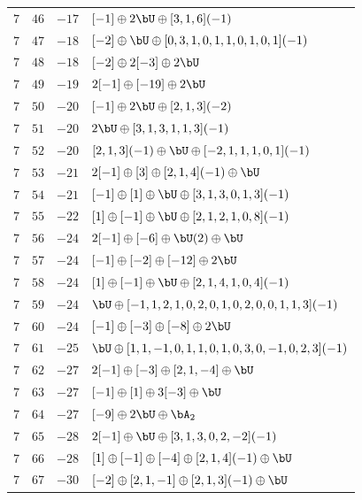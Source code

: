 \begin{center}
\begin{longtable}{llll}
 \(7\) & \(46\) & \(-17\) & \([-1] \oplus 2 \bU \oplus [3, 1, 6](-1)\) \\
 \(7\) & \(47\) & \(-18\) & \([-2] \oplus \bU \oplus [0, 3, 1, 0, 1, 1, 0, 1, 0, 1](-1)\) \\
 \(7\) & \(48\) & \(-18\) & \([-2] \oplus 2 [-3] \oplus 2 \bU\) \\
 \(7\) & \(49\) & \(-19\) & \(2 [-1] \oplus [-19] \oplus 2 \bU\) \\
 \(7\) & \(50\) & \(-20\) & \([-1] \oplus 2 \bU \oplus [2, 1, 3](-2)\) \\
 \(7\) & \(51\) & \(-20\) & \(2 \bU \oplus [3, 1, 3, 1, 1, 3](-1)\) \\
 \(7\) & \(52\) & \(-20\) & \([2, 1, 3](-1) \oplus \bU \oplus [-2, 1, 1, 1, 0, 1](-1)\) \\
 \(7\) & \(53\) & \(-21\) & \(2 [-1] \oplus [3] \oplus [2, 1, 4](-1) \oplus \bU\) \\
 \(7\) & \(54\) & \(-21\) & \([-1] \oplus [1] \oplus \bU \oplus [3, 1, 3, 0, 1, 3](-1)\) \\
 \(7\) & \(55\) & \(-22\) & \([1] \oplus [-1] \oplus \bU \oplus [2, 1, 2, 1, 0, 8](-1)\) \\
 \(7\) & \(56\) & \(-24\) & \(2 [-1] \oplus [-6] \oplus \bU(2) \oplus \bU\) \\
 \(7\) & \(57\) & \(-24\) & \([-1] \oplus [-2] \oplus [-12] \oplus 2 \bU\) \\
 \(7\) & \(58\) & \(-24\) & \([1] \oplus [-1] \oplus \bU \oplus [2, 1, 4, 1, 0, 4](-1)\) \\
 \(7\) & \(59\) & \(-24\) & \(\bU \oplus [-1, 1, 2, 1, 0, 2, 0, 1, 0, 2, 0, 0, 1, 1, 3](-1)\) \\
 \(7\) & \(60\) & \(-24\) & \([-1] \oplus [-3] \oplus [-8] \oplus 2 \bU\) \\
 \(7\) & \(61\) & \(-25\) & \(\bU \oplus [1, 1, -1, 0, 1, 1, 0, 1, 0, 3, 0, -1, 0, 2, 3](-1)\) \\
 \(7\) & \(62\) & \(-27\) & \(2 [-1] \oplus [-3] \oplus [2, 1, -4] \oplus \bU\) \\
 \(7\) & \(63\) & \(-27\) & \([-1] \oplus [1] \oplus 3 [-3] \oplus \bU\) \\
 \(7\) & \(64\) & \(-27\) & \([-9] \oplus 2 \bU \oplus \bA_{2}\) \\
 \(7\) & \(65\) & \(-28\) & \(2 [-1] \oplus \bU \oplus [3, 1, 3, 0, 2, -2](-1)\) \\
 \(7\) & \(66\) & \(-28\) & \([1] \oplus [-1] \oplus [-4] \oplus [2, 1, 4](-1) \oplus \bU\) \\
 \(7\) & \(67\) & \(-30\) & \([-2] \oplus [2, 1, -1] \oplus [2, 1, 3](-1) \oplus \bU\) \\

\end{longtable}
\end{center}
